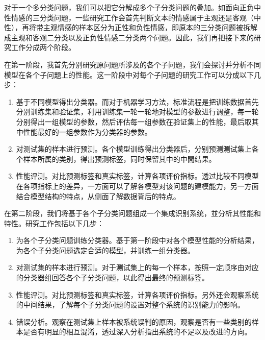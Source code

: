 对于一个多分类问题，我们可以把它分解成多个子分类问题的叠加。如面向正负中性情感的三分类问题，一些研究工作会首先判断文本的情感属于主观还是客观（中性），再将带主观情感的样本区分为正性和负性情感，即原本的三分类问题被拆解成主观和客观二分类以及正负性情感二分类两个问题。因此，我们再把接下来的研究工作分成两个阶段。

在第一阶段，我首先分别研究原问题所涉及的各个子问题，我们会探讨并分析不同模型在各个子问题上的性能。这一阶段中对每个子问题的研究工作可以分成以下几步：

\begin{enumerate}

\item 基于不同模型得出分类器。而对于机器学习方法，标准流程是把训练数据首先分别训练集和验证集，利用训练集一轮一轮地对模型的参数进行调整，每一轮分别得出一组模型的参数，然后评估每一组参数在验证集上的性能，最后取其中性能最好的一组参数作为分类器的参数。

\item 对测试集的样本进行预测。各个模型训练得出分类器后，分别预测测试集上各个样本所属的类别，得出预测标签，同时保留其中的中間结果。

\item 性能评测。对比预测标签和真实标签，计算各项评价指标。透过比较不同模型在各项指标上的差异，一方面可以了解各模型对该问题的建模能力，另一方面结合模型结构的特点，从侧面了解数据背后的特点。

\end{enumerate}

在第二阶段，我们将基于各个子分类问题组成一个集成识别系统，並分析其性能和特性。研究工作包括以下几步：

\begin{enumerate}

\item 为各个子分类问题训练分类器。基于第一阶段中对各个模型性能的分析结果，为各个子分类问题选定合适的模型，并训练一组分类器。

\item 对测试集的样本进行预测。对于测试集上的每一个样本，按照一定顺序由对应的分类器组回答各个子分类问题，以此得出最终的预测标签。

\item 性能评测。对比预测标签和真实标签，计算各项评价指标。另外还会观察系统的中间结果，了解每个子分类问题的设置对整个系统的识别能力的影响。

\item 错误分析。观察在测试集上样本被系统误判的原因，观察是否有一些类别的样本是否有明显的相互混淆，透过深入分析指出系统的不足以及改进的方向。

\end{enumerate}

